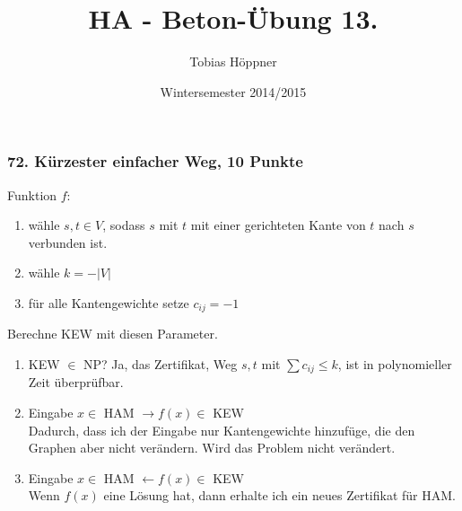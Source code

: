 \documentclass[ngerman,a4paper]{report}
\author{Tobias Höppner}
\title{HA - Beton-Übung 13.}
\date{Wintersemester 2014/2015}
\renewcommand{\maketitle}{}
\begin{document}
 
\maketitle 

\subsubsection*{72. Kürzester einfacher Weg, 10 Punkte}
Funktion $f$: 
\begin{enumerate}
\item wähle $s,t \in V$, sodass $s$ mit $t$ mit einer gerichteten Kante von $t$ nach $s$ verbunden ist.
\item wähle $k = - |V|$
\item für alle Kantengewichte setze $c_{ij} = -1$
\end{enumerate}
Berechne KEW mit diesen Parameter. \\

\begin{enumerate}
\item KEW $\in$ NP? Ja, das Zertifikat, Weg $s,t$ mit  $\sum c_{ij} \leq k$, ist in polynomieller Zeit überprüfbar.
\item Eingabe $x \in$ HAM $\rightarrow f(x) \in $ KEW \\
Dadurch, dass ich der Eingabe nur Kantengewichte hinzufüge, die den Graphen aber nicht verändern. Wird das Problem nicht verändert.
\item Eingabe $x \in$ HAM $\leftarrow f(x) \in $ KEW\\
Wenn $f(x)$ eine Lösung hat, dann erhalte ich ein neues Zertifikat für HAM.
\end{enumerate}
\end{document}
